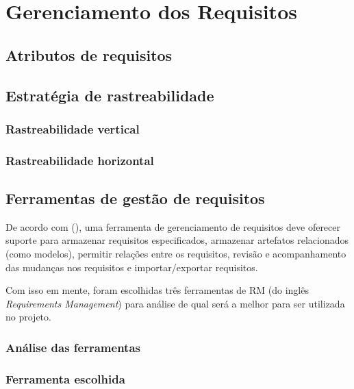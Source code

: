 \chapter[Gerenciamento dos Requisitos]{Gerenciamento dos Requisitos}

  \section{Atributos de requisitos}
  
  \section{Estratégia de rastreabilidade}
  
    \subsection{Rastreabilidade vertical}
    
    \subsection{Rastreabilidade horizontal}
    
  \section{Ferramentas de gestão de requisitos}
    
    De acordo com \citeauthor{beatty13} (\citeyear{beatty13}), uma ferramenta de gerenciamento de requisitos deve oferecer
    suporte para armazenar requisitos especificados, armazenar artefatos relacionados (como modelos), permitir relações
    entre os requisitos, revisão e acompanhamento das mudanças nos requisitos e importar/exportar requisitos.
    
    Com isso em mente, foram escolhidas três ferramentas de RM (do inglês \textit{Requirements Management}) para análise de
    qual será a melhor para ser utilizada no projeto.  
    
    \subsection{Análise das ferramentas}
    
      
    
    \subsection{Ferramenta escolhida}